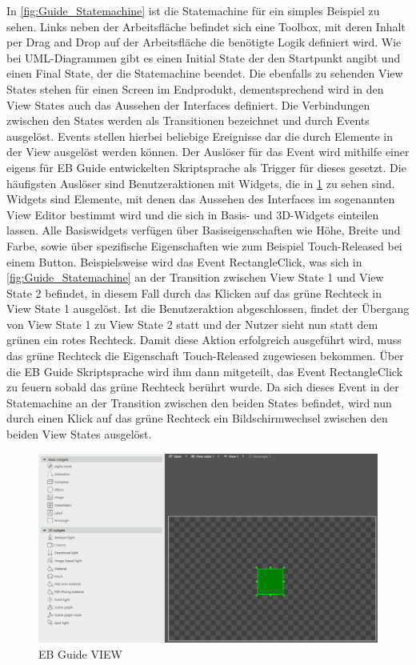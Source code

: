 In \cref{fig:Guide_Statemachine} ist die Statemachine für ein simples Beispiel zu sehen.
Links neben der Arbeitsfläche befindet sich eine Toolbox, mit deren Inhalt per Drag and Drop auf der Arbeitsfläche die benötigte Logik definiert wird.
Wie bei UML-Diagrammen gibt es einen Initial State der den Startpunkt angibt und einen Final State, der die Statemachine beendet.
Die ebenfalls zu sehenden View States stehen für einen Screen im Endprodukt, dementsprechend wird in den View States auch das Aussehen der Interfaces definiert.
Die Verbindungen zwischen den States werden als Transitionen bezeichnet und durch Events ausgelöst.
Events stellen hierbei beliebige Ereignisse dar die durch Elemente in der View ausgelöst werden können.
Der Auslöser für das Event wird mithilfe einer eigens für EB Guide entwickelten Skriptsprache als Trigger für dieses gesetzt.
Die häufigsten Auslöser sind Benutzeraktionen mit Widgets, die in \cref{fig:Guide_View} zu sehen sind.
Widgets sind Elemente, mit denen das Aussehen des Interfaces im sogenannten View Editor bestimmt wird und die sich in Basis- und 3D-Widgets einteilen lassen.
Alle Basiswidgets verfügen über Basiseigenschaften wie Höhe, Breite und Farbe, sowie über spezifische Eigenschaften wie zum Beispiel \glqq Touch-Released\grqq{} bei einem Button.\cite{studio_guide}
Beispielsweise wird das Event \glqq RectangleClick\grqq{}, was sich in \cref{fig:Guide_Statemachine} an der Transition zwischen View State 1 und View State 2 befindet, in diesem Fall durch das Klicken auf das grüne Rechteck in View State 1 ausgelöst.
Ist die Benutzeraktion abgeschlossen, findet der Übergang von View State 1 zu View State 2 statt und der Nutzer sieht nun statt dem grünen ein rotes Rechteck.
Damit diese Aktion erfolgreich ausgeführt wird, muss das grüne Rechteck die Eigenschaft \glqq Touch-Released\grqq{} zugewiesen bekommen.
Über die EB Guide Skriptsprache wird ihm dann mitgeteilt, das Event RectangleClick zu feuern sobald das grüne Rechteck berührt wurde.
Da sich dieses Event in der Statemachine an der Transition zwischen den beiden States befindet, wird nun durch einen Klick auf das grüne Rechteck ein Bildschirmwechsel zwischen den beiden View States ausgelöst.

\begin{figure}[H]
\begin{center}
  \includegraphics[scale=0.4]{figures/Guide_View.PNG}
  \caption{EB Guide VIEW}
  \label{fig:Guide_View}
\end{center}
\end{figure}



